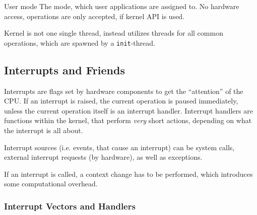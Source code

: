 \documentclass[english]{panikzettel}
\begin{document}
	\begin{defi}{User mode}
		The mode, which user applications are assigned to. No hardware access, operations are only accepted, if kernel API is used.
	\end{defi}
	
	Kernel is not one single thread, instead utilizes threads for all common operations, which are spawned by a \texttt{init}-thread.

	\subsection{Interrupts and Friends}
	\label{ss-interrupts}
	
	Interrupts are flags set by hardware components to get the \enquote{attention} of the CPU.
	If an interrupt is raised, the current operation is paused immediately, unless the current operation itself is an interrupt handler.
	Interrupt handlers are functions within the kernel, that perform \textit{very} short actions, depending on what the interrupt is all about. 
	
	Interrupt sources (i.e. events, that cause an interrupt) can be system calls, external interrupt requests (by hardware), as well as exceptions.

	If an interrupt is called, a context change has to be performed, which introduces some computational overhead.

	\subsubsection{Interrupt Vectors and Handlers}
	\label{sss-interrupt-vectors}
	
\end{document}
